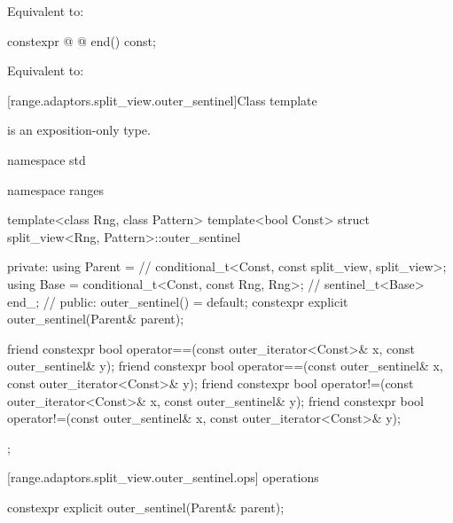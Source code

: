{\begin{itemdescr}
\pnum
\effects Equivalent to: 
\end{itemdescr}

%
\begin{itemdecl}
constexpr @ @ end() const;
\end{itemdecl}

\begin{itemdescr}
\pnum
\effects Equivalent to: 
\end{itemdescr}

{\color{oldclr}
[range.adaptors.split_view.outer_sentinel]{Class template }

\pnum
\begin{note}
 is an exposition-only type.
\end{note}

\begin{codeblock}
namespace std { namespace ranges {
  template<class Rng, class Pattern>
  template<bool Const>
  struct split_view<Rng, Pattern>::outer_sentinel {
  private:
    using Parent =                                       // \expos
      conditional_t<Const, const split_view, split_view>;
    using Base   = conditional_t<Const, const Rng, Rng>; // \expos
    sentinel_t<Base> end_;                               // \expos
  public:
    outer_sentinel() = default;
    constexpr explicit outer_sentinel(Parent& parent);

    friend constexpr bool operator==(const outer_iterator<Const>& x, const outer_sentinel& y);
    friend constexpr bool operator==(const outer_sentinel& x, const outer_iterator<Const>& y);
    friend constexpr bool operator!=(const outer_iterator<Const>& x, const outer_sentinel& y);
    friend constexpr bool operator!=(const outer_sentinel& x, const outer_iterator<Const>& y);
  };
}}
\end{codeblock}

[range.adaptors.split_view.outer_sentinel.ops]{ operations}

%
\begin{itemdecl}
constexpr explicit outer_sentinel(Parent& parent);
\end{itemdecl}

}}
